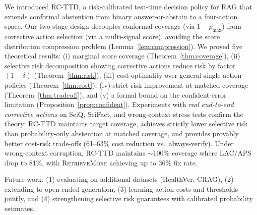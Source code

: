 \documentclass[letterpaper]{article}
\begin{document}
We introduced RC-TTD, a risk-calibrated test-time decision policy for RAG that extends conformal abstention from binary answer-or-abstain to a four-action space. Our two-stage design decouples conformal coverage (via $1-p_{\max}$) from corrective action selection (via a multi-signal score), avoiding the score distribution compression problem (Lemma~\ref{lem:compression}). We proved five theoretical results: (i) marginal score coverage (Theorem~\ref{thm:coverage}), (ii) selective risk decomposition showing corrective actions reduce risk by factor $(1{-}\delta)$ (Theorem~\ref{thm:risk}), (iii) cost-optimality over general single-action policies (Theorem~\ref{thm:cost}), (iv) strict risk improvement at matched coverage (Theorem~\ref{thm:tradeoff}), and (v) a formal bound on the confident-error limitation (Proposition~\ref{prop:confident}). Experiments with \emph{real end-to-end corrective actions} on SciQ, SciFact, and wrong-context stress tests confirm the theory: RC-TTD maintains target coverage, achieves strictly lower selective risk than probability-only abstention at matched coverage, and provides provably better cost-risk trade-offs (61--63\% cost reduction vs.\ always-verify). Under wrong-context corruption, RC-TTD maintains $\sim$100\% coverage where LAC/APS drop to 81\%, with \textsc{RetrieveMore} achieving up to 36\% fix rate.

Future work: (1) evaluating on additional datasets (HealthVer, CRAG), (2) extending to open-ended generation, (3) learning action costs and thresholds jointly, and (4) strengthening selective risk guarantees with calibrated probability estimates.




\end{document}
